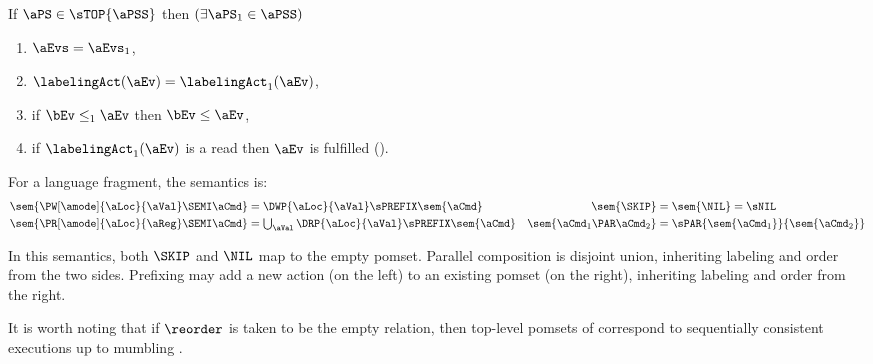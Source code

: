 \begin{definition}
\begin{enumerate}[topsep=0pt]
    \setcounter{pomsetPrefixOrderCount}{\value{enumi}}    
  \end{enumerate}
  \noindent
  If $\aPS \in \sTOP{\aPSS}$ then
  $(\exists\aPS_1\in\aPSS)$
  \begin{enumerate}[topsep=0pt]
  \item  \label{top-E} %
    $\aEvs=\aEvs_1$,
  \item  \label{top-lambda} %
    $\labelingAct(\aEv) = \labelingAct_1(\aEv)$,
  \item  \label{top-le} %
    if $\bEv\le_1\aEv$ then $\bEv\le\aEv$, 
  \item  \label{top-fulfilled} %
    if $\labelingAct_1(\aEv)$ is a read then
    $\aEv$ is fulfilled ().
    \label{pomsetTopCountLast}
    \setcounter{pomsetTopCount}{\value{enumi}}
  \end{enumerate}  
\end{definition}
\begin{definition}
  \noindent
  For a language fragment, the semantics is:
  \begin{align*}
    \sem{\PW[\amode]{\aLoc}{\aVal}\SEMI \aCmd} &= \textstyle\DWP{\aLoc}{\aVal}\sPREFIX\sem{\aCmd}
    &
    \sem{\SKIP} &= \sem{\NIL} = \sNIL 
    \\
    \sem{\PR[\amode]{\aLoc}{\aReg}\SEMI \aCmd} &= \textstyle\bigcup_{\aVal}\DRP{\aLoc}{\aVal}\sPREFIX\sem{\aCmd}
    &
    \sem{\aCmd_1 \PAR \aCmd_2} &= \sPAR{\sem{\aCmd_1}}{\sem{\aCmd_2}}
  \end{align*}
\end{definition}

In this semantics, both $\SKIP$ and $\NIL$ map to the empty pomset.  Parallel
composition is disjoint union, inheriting labeling and order from the two
sides.  Prefixing may add a new action (on the left) to an existing pomset
(on the right), inheriting labeling and order from the right.  

It is worth noting that if ${\reorder}$ is taken to be the empty relation,
then top-level pomsets of  correspond to sequentially
consistent executions up to mumbling
\cite{DBLP:journals/iandc/Brookes96}.

